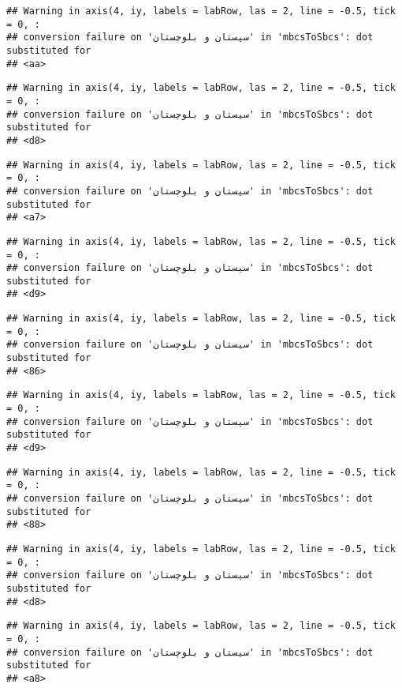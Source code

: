 \documentclass[
]{article}
\begin{document}
\begin{verbatim}
## Warning in axis(4, iy, labels = labRow, las = 2, line = -0.5, tick = 0, :
## conversion failure on 'سیستان و بلوچستان' in 'mbcsToSbcs': dot substituted for
## <aa>
\end{verbatim}

\begin{verbatim}
## Warning in axis(4, iy, labels = labRow, las = 2, line = -0.5, tick = 0, :
## conversion failure on 'سیستان و بلوچستان' in 'mbcsToSbcs': dot substituted for
## <d8>
\end{verbatim}

\begin{verbatim}
## Warning in axis(4, iy, labels = labRow, las = 2, line = -0.5, tick = 0, :
## conversion failure on 'سیستان و بلوچستان' in 'mbcsToSbcs': dot substituted for
## <a7>
\end{verbatim}

\begin{verbatim}
## Warning in axis(4, iy, labels = labRow, las = 2, line = -0.5, tick = 0, :
## conversion failure on 'سیستان و بلوچستان' in 'mbcsToSbcs': dot substituted for
## <d9>
\end{verbatim}

\begin{verbatim}
## Warning in axis(4, iy, labels = labRow, las = 2, line = -0.5, tick = 0, :
## conversion failure on 'سیستان و بلوچستان' in 'mbcsToSbcs': dot substituted for
## <86>
\end{verbatim}

\begin{verbatim}
## Warning in axis(4, iy, labels = labRow, las = 2, line = -0.5, tick = 0, :
## conversion failure on 'سیستان و بلوچستان' in 'mbcsToSbcs': dot substituted for
## <d9>
\end{verbatim}

\begin{verbatim}
## Warning in axis(4, iy, labels = labRow, las = 2, line = -0.5, tick = 0, :
## conversion failure on 'سیستان و بلوچستان' in 'mbcsToSbcs': dot substituted for
## <88>
\end{verbatim}

\begin{verbatim}
## Warning in axis(4, iy, labels = labRow, las = 2, line = -0.5, tick = 0, :
## conversion failure on 'سیستان و بلوچستان' in 'mbcsToSbcs': dot substituted for
## <d8>
\end{verbatim}

\begin{verbatim}
## Warning in axis(4, iy, labels = labRow, las = 2, line = -0.5, tick = 0, :
## conversion failure on 'سیستان و بلوچستان' in 'mbcsToSbcs': dot substituted for
## <a8>
\end{verbatim}
\end{document}
